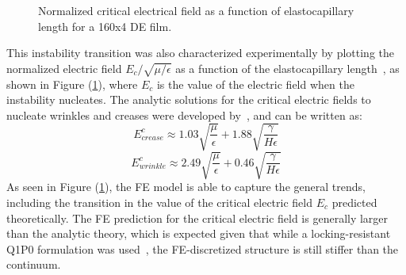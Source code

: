 \documentclass[final,authoryear,3p,times]{elsarticle}
\begin{document}

\begin{figure}
\centering
{}
	\caption{Normalized critical electrical field as a function of elastocapillary length for a 160x4 DE film.}
	\label{ecrit2}
\end{figure}

This instability transition was also characterized experimentally by plotting the normalized electric field $E_{c}/\sqrt{\mu/\epsilon}$  as a function of the elastocapillary length~\cite{wangPRE2013}, as shown in Figure (\ref{ecrit2}), where $E_{c}$ is the value of the electric field when the instability nucleates.  The analytic solutions for the critical electric fields to nucleate wrinkles and creases were developed by~\citet{wangPRE2013}, and can be written as:  
\begin{equation} \label{eqn:ECcrease}
E^{c}_{crease}\approx1.03\sqrt{\frac{\mu}{\epsilon}}+1.88\sqrt{\frac{\gamma}{H\epsilon}}
\end{equation}
\begin{equation} \label{eqn:ECwrinkle}
E^{c}_{wrinkle}\approx2.49\sqrt{\frac{\mu}{\epsilon}}+0.46\sqrt{\frac{\gamma}{H\epsilon}}
\end{equation}
As seen in Figure (\ref{ecrit2}), the FE model is able to capture the general trends, including the transition in the value of the critical electric field $E_{c}$ predicted theoretically.  The FE prediction for the critical electric field is generally larger than the analytic theory, which is expected given that while a locking-resistant Q1P0 formulation was used~\cite{simoCMAME1985}, the FE-discretized structure is still stiffer than the continuum.  
\end{document}
